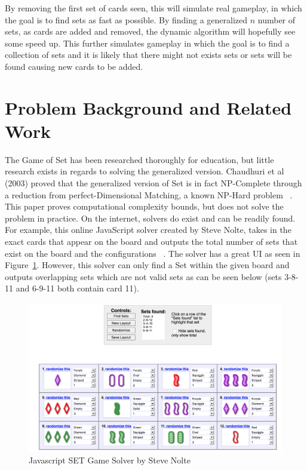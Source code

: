 \documentclass[pageno]{jpaper}
\begin{document}
By removing the first set of cards seen, this will simulate real gameplay, in which the goal is to find sets as fast as possible. By finding a generalized $n$ number of sets, as cards are added and removed, the dynamic algorithm will hopefully see some speed up. This further simulates gameplay in which the goal is to find a collection of sets and it is likely that there might not exists sets or sets will be found causing new cards to be added. 


\section{Problem Background and Related Work}


The Game of Set has been researched thoroughly for education, but little research exists in regards to solving the generalized version. Chaudhuri et al (2003) proved that the generalized version of Set is in fact NP-Complete through a reduction from perfect-Dimensional Matching, a known NP-Hard problem ~\cite{chaudhuri}. This paper proves computational complexity bounds, but does not solve the problem in practice. On the internet, solvers do exist and can be readily found. For example, this online JavaScript solver created by Steve Nolte, takes in the exact cards that appear on the board and outputs the total number of sets that exist on the board and the configurations ~\cite{nolte}. The solver has a great UI as seen in Figure~\ref{fig:nolteUI}. However, this solver can only find a Set within the given board and outputs overlapping sets which are not valid sets as can be seen below (sets 3-8-11 and 6-9-11 both contain card 11). 

\begin{figure}[htbb]
\centering
\begin{minipage}[b]{.75\linewidth}
\includegraphics[width=\linewidth]{nolte.png}
\caption{Javascript SET Game Solver by Steve Nolte}
\label{fig:nolteUI}
\end{minipage}
\end{figure}
\end{document}
